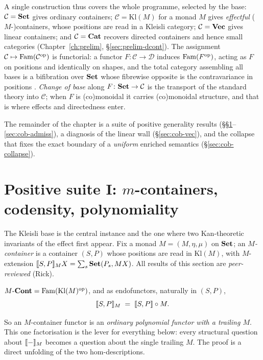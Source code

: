 A single construction thus covers the whole programme, selected by the base:
$\mathcal{C}=\mathbf{Set}$ gives ordinary containers; $\mathcal{C}=\mathrm{Kl}(M)$ for a
monad $M$ gives \emph{effectful} ($M$-)containers, whose positions are read in a
Kleisli category; $\mathcal{C}=\mathbf{Vec}$ gives linear containers; and
$\mathcal{C}=\mathbf{Cat}$ recovers directed containers and hence small categories
(Chapter~\ref{ch:prelim}, \S\ref{sec:prelim-dcont}). The assignment
$\mathcal{C}\mapsto\mathrm{Fam}(\mathcal{C}^{\mathrm{op}})$ is functorial: a functor
$F\colon\mathcal{C}\to\mathcal{D}$ induces $\mathrm{Fam}(F^{\mathrm{op}})$, acting as $F$ on
positions and identically on shapes, and the total category assembling all bases
is a bifibration over $\mathbf{Set}$ whose fibrewise opposite is the contravariance in
positions \cite{vonGlehn}. \emph{Change of base} along $F\colon\mathbf{Set}\to\mathcal{C}$
is the transport of the standard theory into $\mathcal{C}$; when $F$ is
(co)monoidal it carries (co)monoidal structure, and that is where effects and
directedness enter.

The remainder of the chapter is a suite of positive generality results
(\S\S\ref{sec:cob-mcont}--\ref{sec:cob-admiss}), a diagnosis of the linear wall
(\S\ref{sec:cob-vec}), and the collapse that fixes the exact boundary of a
\emph{uniform} enriched semantics (\S\ref{sec:cob-collapse}).

\section{Positive suite I: $m$-containers, codensity, polynomiality}
\label{sec:cob-mcont}

The Kleisli base is the central instance and the one where two Kan-theoretic
invariants of the effect first appear. Fix a monad $M=(M,\eta,\mu)$ on $\mathbf{Set}$; an
\emph{$M$-container} is a container $(S,P)$ whose positions are read in
$\mathrm{Kl}(M)$, with $M$-extension $\llbracket S,P \rrbracket_M X=\sum_{s}\mathbf{Set}(P_s,MX)$. All
results of this section are \emph{peer-reviewed} (Rick).

\begin{theorem}\label{thm:cob-mfactor}
$M\text{-}\mathbf{Cont}=\mathrm{Fam}(\mathrm{Kl}(M)^{\mathrm{op}})$, and as endofunctors, naturally in
$(S,P)$,
\[
  \llbracket S,P \rrbracket_M\;=\;\llbracket S,P \rrbracket\circ M .
\]
\end{theorem}

So an $M$-container functor is an \emph{ordinary polynomial functor with a
trailing $M$}. This one factorisation is the lever for everything below: every
structural question about $\llbracket - \rrbracket_M$ becomes a question about the single
trailing $M$. The proof is a direct unfolding of the two hom-descriptions.

